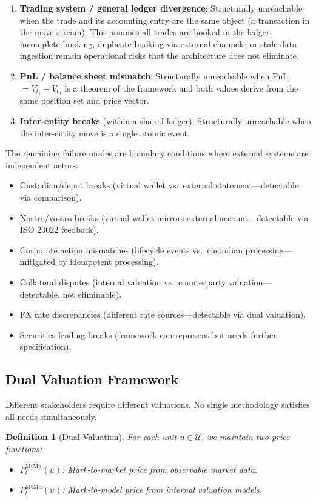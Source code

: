 \documentclass[11pt,a4paper]{article}
\newtheorem{definition}{Definition}[section]
\begin{document}
\begin{enumerate}
\item \textbf{Trading system / general ledger divergence}: Structurally unreachable when the trade and its accounting entry are the same object (a transaction in the move stream). This assumes all trades are booked in the ledger; incomplete booking, duplicate booking via external channels, or stale data ingestion remain operational risks that the architecture does not eliminate.
\item \textbf{PnL / balance sheet mismatch}: Structurally unreachable when PnL $= V_{t_1} - V_{t_0}$ is a theorem of the framework and both values derive from the same position set and price vector.
\item \textbf{Inter-entity breaks} (within a shared ledger): Structurally unreachable when the inter-entity move is a single atomic event.
\end{enumerate}

The remaining failure modes are boundary conditions where external systems are independent actors:

\begin{itemize}[nosep]
\item Custodian/depot breaks (virtual wallet vs.\ external statement---detectable via comparison).
\item Nostro/vostro breaks (virtual wallet mirrors external account---detectable via ISO 20022 feedback).
\item Corporate action mismatches (lifecycle events vs.\ custodian processing---mitigated by idempotent processing).
\item Collateral disputes (internal valuation vs.\ counterparty valuation---detectable, not eliminable).
\item FX rate discrepancies (different rate sources---detectable via dual valuation).
\item Securities lending breaks (framework can represent but needs further specification).
\end{itemize}

\subsection{Dual Valuation Framework}

Different stakeholders require different valuations. No single methodology satisfies all needs simultaneously.

\begin{definition}[Dual Valuation]
For each unit $u \in \mathcal{U}$, we maintain two price functions:
\begin{itemize}[nosep]
\item $P_t^{\text{MtMk}}(u)$: Mark-to-market price from observable market data.
\item $P_t^{\text{MtMd}}(u)$: Mark-to-model price from internal valuation models.
\end{itemize}
\end{definition}
\end{document}
